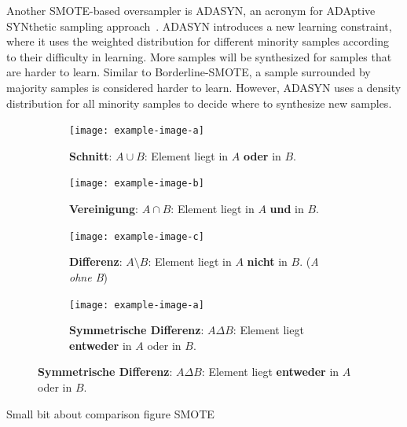 Another SMOTE-based oversampler is ADASYN, an acronym for ADAptive SYNthetic sampling approach~\cite{He2008ADASYN:Learning}. ADASYN introduces a new learning constraint, where it uses the weighted distribution for different minority samples according to their difficulty in learning. More samples will be synthesized for samples that are harder to learn. Similar to Borderline-SMOTE, a sample surrounded by majority samples is considered harder to learn. However, ADASYN uses a density distribution for all minority samples to decide where to synthesize new samples.

\begin{figure}
  \begin{subfigure}[t]{.4\textwidth}
    \centering
    \texttt{[image: example-image-a]}
    \caption{\textbf{Schnitt}: $A \cup B$: Element liegt in $A$ \textbf{oder} in $B$.}
  \end{subfigure}
  \hfill
  \begin{subfigure}[t]{.4\textwidth}
    \centering
    \texttt{[image: example-image-b]}
    \caption{\textbf{Vereinigung}: $A \cap B$: Element liegt in $A$ \textbf{und} in $B$.}
  \end{subfigure}

  \medskip

  \begin{subfigure}[t]{.4\textwidth}
    \centering
    \texttt{[image: example-image-c]}
    \caption{\textbf{Differenz}: $A \setminus B$: Element liegt in $A$ \textbf{nicht} in $B$. (\textit{A ohne B})}
  \end{subfigure}
  \hfill
  \begin{subfigure}[t]{.4\textwidth}
    \centering
    \texttt{[image: example-image-a]}
    \caption{\textbf{Symmetrische Differenz}: $A \Delta B$: Element liegt \textbf{entweder} in $A$ oder in $B$.}
  \end{subfigure}
\end{figure}

Small bit about comparison figure SMOTE